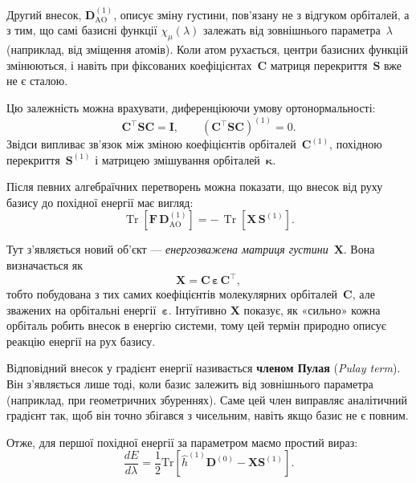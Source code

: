 Другий внесок, $\mathbf D^{(1)}_{\text{AO}}$, описує зміну густини, пов’язану не з відгуком орбіталей, а з тим, що самі базисні функції $\chi_\mu(\lambda)$ залежать від зовнішнього параметра~$\lambda$ (наприклад, від зміщення атомів).
Коли атом рухається, центри базисних функцій змінюються, і навіть при фіксованих коефіцієнтах~$\mathbf C$ матриця перекриття~$\mathbf S$ вже не є сталою.

Цю залежність можна врахувати, диференціюючи умову ортонормальності:
\[
\mathbf C^\top \mathbf S \mathbf C = \mathbf I,
\qquad
(\mathbf C^\top \mathbf S \mathbf C)^{(1)} = 0.
\]
Звідси випливає зв’язок між зміною коефіцієнтів орбіталей~$\mathbf C^{(1)}$, похідною перекриття~$\mathbf S^{(1)}$ і матрицею змішування орбіталей~$\boldsymbol{\kappa}$.

Після певних алгебраїчних перетворень можна показати, що внесок від руху базису до похідної енергії має вигляд:
\[
\operatorname{Tr}[\mathbf F\,\mathbf D^{(1)}_{\text{AO}}]
= -\,\operatorname{Tr}[\mathbf X\,\mathbf S^{(1)}].
\]

Тут з’являється новий об’єкт — \emph{енергозважена матриця густини}~$\mathbf X$.
Вона визначається як
\[
\mathbf X = \mathbf C\,\boldsymbol{\varepsilon}\,\mathbf C^\top,
\]
тобто побудована з тих самих коефіцієнтів молекулярних орбіталей~$\mathbf C$, але зважених на орбітальні енергії~$\boldsymbol{\varepsilon}$.
Інтуїтивно $\mathbf X$ показує, як «сильно» кожна орбіталь робить внесок в енергію системи, тому цей термін природно описує реакцію енергії на рух базису.

Відповідний внесок у градієнт енергії називається \textbf{членом Пулая} (\emph{Pulay term}).
Він з’являється лише тоді, коли базис залежить від зовнішнього параметра (наприклад, при геометричних збуреннях).
Саме цей член виправляє аналітичний градієнт так, щоб він точно збігався з чисельним, навіть якщо базис не є повним.


Отже, для першої похідної енергії за параметром маємо простий вираз:
\begin{equation}
\frac{dE}{d\lambda} = \frac12 \mathrm{Tr}[\hat h^{(1)}\mathbf D^{(0)}  - \mathbf X \mathbf S^{(1)}].
\end{equation}




